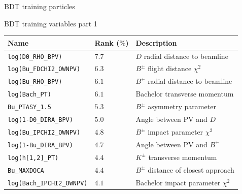 \documentclass{beamer}
\begin{document}
\begin{frame}{BDT training particles}
  \begin{center}
    BDT training variables part 1
  \end{center}
  \centering
  \begin{tabular}{|l|l|l|}
    \hline
    Name & Rank ($\%$) & Description \\
    \hline
    \texttt{log(D0\_RHO\_BPV)} & $7.7$ & $D$ radial distance to beamline \\
    \texttt{log(Bu\_FDCHI2\_OWNPV)} & $6.3$ & $B^\pm$ flight distance $\chi^2$ \\
    \texttt{log(Bu\_RHO\_BPV)} & $6.1$ & $B^\pm$ radial distance to beamline \\
    \texttt{log(Bach\_PT)} & $6.1$ & Bachelor transverse momentum \\
    \texttt{Bu\_PTASY\_1.5} & $5.3$ & $B^\pm$ asymmetry parameter \\
    \texttt{log(1-D0\_DIRA\_BPV)} & $5.0$ & Angle between PV and $D$ \\
    \texttt{log(Bu\_IPCHI2\_OWNPV)} & $4.8$ & $B^\pm$ impact parameter $\chi^2$ \\
    \texttt{log(1-Bu\_DIRA\_BPV)} & $4.7$ & Angle between PV and $B^\pm$ \\
    \texttt{log(h[1,2]\_PT)} & $4.4$ & $K^\pm$ transverse momentum \\
    \texttt{Bu\_MAXDOCA} & $4.4$ & $B^\pm$ distance of closest approach \\
    \texttt{log(Bach\_IPCHI2\_OWNPV)} & $4.1$ & Bachelor impact parameter $\chi^2$ \\
    \hline
  \end{tabular}
\end{frame}
\end{document}

